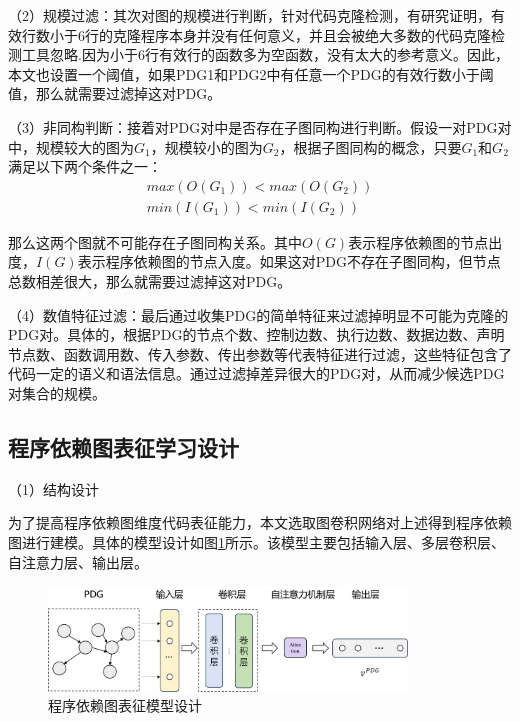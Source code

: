 （2）规模过滤：其次对图的规模进行判断，针对代码克隆检测，有研究证明，有效行数小于6行的克隆程序本身并没有任何意义，并且会被绝大多数的代码克隆检测工具忽略.因为小于6行有效行的函数多为空函数，没有太大的参考意义。因此，本文也设置一个阈值，如果PDG1和PDG2中有任意一个PDG的有效行数小于阈值，那么就需要过滤掉这对PDG。

（3）非同构判断：接着对PDG对中是否存在子图同构进行判断。假设一对PDG对中，规模较大的图为$G_1$，规模较小的图为$G_2$，根据子图同构的概念，只要$G_1$和$G_2$满足以下两个条件之一：
\begin{equation}\label{e5.1}
  \begin{split}
    max(O(G_1)) < max(O(G_2)) \\
    min(I(G_1)) < min(I(G_2))
  \end{split}
\end{equation}

那么这两个图就不可能存在子图同构关系。其中$O(G)$表示程序依赖图的节点出度，$I(G)$表示程序依赖图的节点入度。如果这对PDG不存在子图同构，但节点总数相差很大，那么就需要过滤掉这对PDG。

（4）数值特征过滤：最后通过收集PDG的简单特征来过滤掉明显不可能为克隆的PDG对。具体的，根据PDG的节点个数、控制边数、执行边数、数据边数、声明节点数、函数调用数、传入参数、传出参数等代表特征进行过滤，这些特征包含了代码一定的语义和语法信息。通过过滤掉差异很大的PDG对，从而减少候选PDG对集合的规模。


\subsection{程序依赖图表征学习设计}
\label{subsec:PDGModel}

（1）结构设计

为了提高程序依赖图维度代码表征能力，本文选取图卷积网络对上述得到程序依赖图进行建模。具体的模型设计如图\ref{fig:pdgmodel}所示。该模型主要包括输入层、多层卷积层、自注意力层、输出层。
\begin{figure}[H]
  \centering
  \includegraphics[width=0.85\textwidth]{figures/pdgmodel.png}
  \caption{程序依赖图表征模型设计}\label{fig:pdgmodel}
\end{figure}

